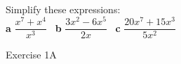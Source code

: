 \documentclass[fleqn, twoside]{article}
\begin{document}
\begin{examplebox}{}{}
    \\ %
    Simplify these expressions:\vspace{2mm}    \\
    \textbf{a}\hspace{2mm} $\dfrac{x^7+x^4}{x^3}$    \hspace{7mm} \
    \textbf{b}\hspace{2mm} $\dfrac{3x^2-6x^5}{2x}$     \hspace{7mm} \
    \textbf{c}\hspace{2mm} $\dfrac{20x^7+15x^3}{5x^2}$
\end{examplebox}

\vfill
\begin{practice*}{Exercise 1A}{}
\end{practice*}
\newpage
\end{document}
